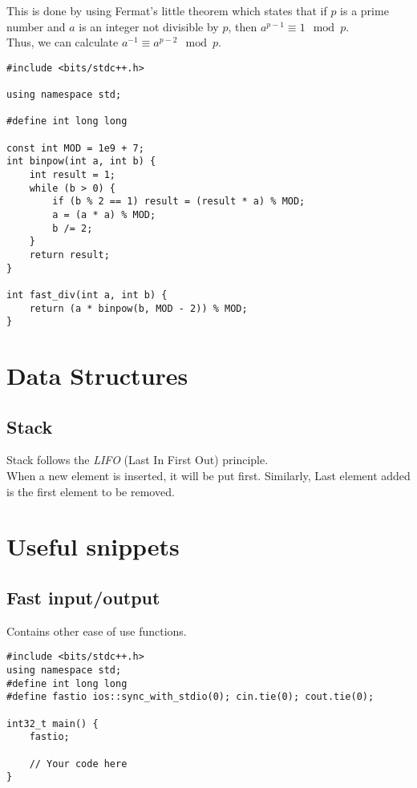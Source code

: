 \documentclass{cpnote}
\begin{document}
This is done by using Fermat's little theorem which states that if \(p\) is a prime number and \(a\) is an integer not divisible by \(p\), then \(a^{p-1} \equiv 1 \mod p\). \\
Thus, we can calculate \(a^{-1} \equiv a^{p-2} \mod p\).

\begin{verbatim}
#include <bits/stdc++.h>

using namespace std;

#define int long long

const int MOD = 1e9 + 7;
int binpow(int a, int b) {
    int result = 1;
    while (b > 0) {
        if (b % 2 == 1) result = (result * a) % MOD;
        a = (a * a) % MOD;
        b /= 2;
    }
    return result;
}

int fast_div(int a, int b) {
    return (a * binpow(b, MOD - 2)) % MOD;
}
\end{verbatim}

\section{Data Structures}
\subsection{Stack}
Stack follows the \emph{LIFO} (Last In First Out) principle. \\
When a new element is inserted, it will be put first. Similarly, 
Last element added is the first element to be removed. \\

\section{Useful snippets}
\subsection{Fast input/output}
Contains other ease of use functions.
\begin{verbatim}
#include <bits/stdc++.h>
using namespace std;
#define int long long
#define fastio ios::sync_with_stdio(0); cin.tie(0); cout.tie(0);

int32_t main() {
    fastio;

    // Your code here
}
\end{verbatim}
\end{document}
